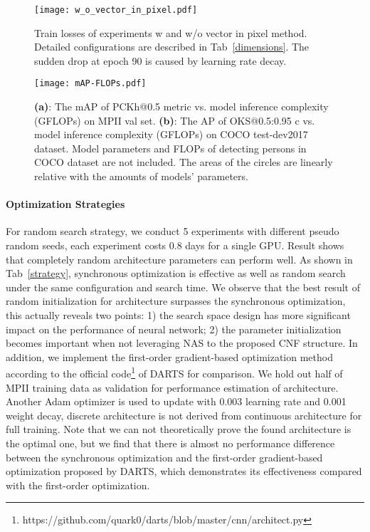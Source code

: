 \documentclass[journal]{IEEEtran}
\begin{document}
\begin{figure}
	
	\centering


	\texttt{[image: w\_o\_vector\_in\_pixel.pdf]}
	\caption{Train losses of experiments w and w/o vector in pixel method. Detailed configurations are described in Tab~\ref{dimensions}. The sudden drop at epoch 90 is caused by learning rate decay.}
	\centering
	\label{w_o_vector_in_pixel}
	
\end{figure}


\begin{figure*}[h]
	
	\centering
\texttt{[image: mAP-FLOPs.pdf]}
	\caption{\textbf{(a)}: The mAP of PCKh@0.5 metric vs. model inference complexity (GFLOPs) on MPII val set. \textbf{(b)}: The AP of OKS@0.5:0.95 c vs. model inference complexity (GFLOPs) on COCO test-dev2017 dataset. Model parameters and FLOPs of detecting persons in COCO dataset are not included. The areas of the circles are linearly relative with the amounts of models' parameters. }
	\centering
	\label{MAP-FLOPS}
	
\end{figure*}


\paragraph{Optimization Strategies} For random search strategy, we conduct 5 experiments with different pseudo random seeds, each experiment costs 0.8 days for a single GPU. Result shows that completely random architecture parameters can perform well. As shown in Tab~\ref{strategy}, synchronous optimization is effective as well as random search under the same configuration and search time. We observe that the best result of random initialization for architecture surpasses the synchronous optimization, this actually reveals two points: 1) the search space design has more significant impact on the performance of neural network; 2) the parameter initialization becomes important when not leveraging NAS to the proposed CNF structure. In addition, we implement the first-order gradient-based optimization method according to the official code\footnote{https://github.com/quark0/darts/blob/master/cnn/architect.py} of DARTS \cite{liu2018darts} for comparison. We hold out half of MPII training data as validation for performance estimation of architecture. Another Adam optimizer is used to update  with 0.003 learning rate and 0.001 weight decay, discrete architecture is not derived from continuous architecture for full training. Note that we can not theoretically prove the found architecture is the optimal one, but we find that there is almost no performance difference between the synchronous optimization and the first-order gradient-based optimization proposed by DARTS, which demonstrates its effectiveness compared with the first-order optimization.
\end{document}
